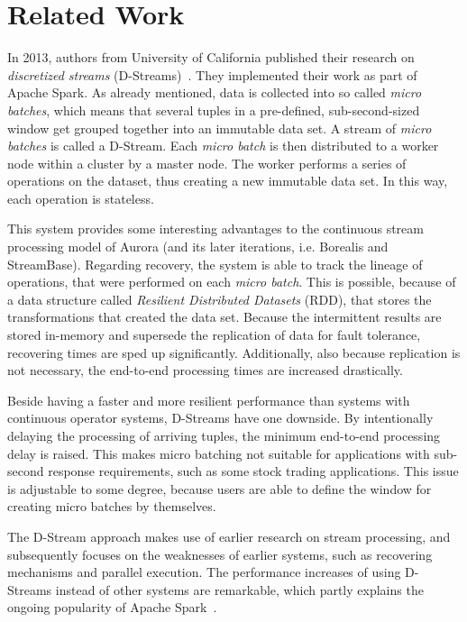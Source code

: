 \section{Related Work}\label{relatedWork}
In 2013, authors from University of California published their research on \textit{discretized streams} (D-Streams)~\cite{SparkDStream}. They implemented their work as part of Apache Spark. As already mentioned, data is collected into so called \textit{micro batches}, which means that several tuples in a pre-defined, sub-second-sized window get grouped together into an immutable data set. A stream of \textit{micro batches} is called a D-Stream. Each \textit{micro batch} is then distributed to a worker node within a cluster by a master node. The worker performs a series of operations on the dataset, thus creating a new immutable data set. In this way, each operation is stateless. 

This system provides some interesting advantages to the continuous stream processing model of Aurora (and its later iterations, i.e. Borealis and StreamBase). Regarding recovery, the system is able to track the lineage of operations, that were performed on each \textit{micro batch}. This is possible, because of a data structure called \textit{Resilient Distributed Datasets} (RDD), that stores the transformations that created the data set. Because the intermittent results are stored in-memory and supersede the replication of data for fault tolerance, recovering times are sped up significantly. Additionally, also because replication is not necessary, the end-to-end processing times are increased drastically. 

Beside having a faster and more resilient performance than systems with continuous operator systems, D-Streams have one downside. By intentionally delaying the processing of arriving tuples, the minimum end-to-end processing delay is raised. This makes micro batching not suitable for applications with sub-second response requirements, such as some stock trading applications. This issue is adjustable to some degree, because users are able to define the window for creating micro batches by themselves.

The D-Stream approach makes use of earlier research on stream processing, and subsequently focuses on the weaknesses of earlier systems, such as recovering mechanisms and parallel execution. The performance increases of using D-Streams instead of other systems are remarkable, which partly explains the ongoing popularity of Apache Spark~\cite{SparkUsers}.